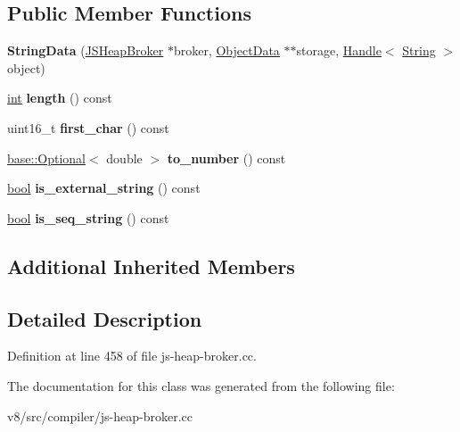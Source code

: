 \subsection*{Public Member Functions}
\begin{DoxyCompactItemize}
\item 
\mbox{\label{classv8_1_1internal_1_1compiler_1_1StringData_a19207d0108f212b6bbe337c6b49a9733}} 
{\bfseries String\+Data} (\mbox{\hyperlink{classv8_1_1internal_1_1compiler_1_1JSHeapBroker}{J\+S\+Heap\+Broker}} $\ast$broker, \mbox{\hyperlink{classv8_1_1internal_1_1compiler_1_1ObjectData}{Object\+Data}} $\ast$$\ast$storage, \mbox{\hyperlink{classv8_1_1internal_1_1Handle}{Handle}}$<$ \mbox{\hyperlink{classv8_1_1internal_1_1String}{String}} $>$ object)
\item 
\mbox{\label{classv8_1_1internal_1_1compiler_1_1StringData_a81f6f4932b95a485268c1db8f451e032}} 
\mbox{\hyperlink{classint}{int}} {\bfseries length} () const
\item 
\mbox{\label{classv8_1_1internal_1_1compiler_1_1StringData_a1132f6d603045bec73f5f9e1aa2cd648}} 
uint16\+\_\+t {\bfseries first\+\_\+char} () const
\item 
\mbox{\label{classv8_1_1internal_1_1compiler_1_1StringData_aad2337c802f4112335e14c749e0c304c}} 
\mbox{\hyperlink{classv8_1_1base_1_1Optional}{base\+::\+Optional}}$<$ double $>$ {\bfseries to\+\_\+number} () const
\item 
\mbox{\label{classv8_1_1internal_1_1compiler_1_1StringData_aee112f4dacbb2d603ad0623fc3dcb063}} 
\mbox{\hyperlink{classbool}{bool}} {\bfseries is\+\_\+external\+\_\+string} () const
\item 
\mbox{\label{classv8_1_1internal_1_1compiler_1_1StringData_aaa6b0b8dd7f5a66e5cb8cb6195492a0b}} 
\mbox{\hyperlink{classbool}{bool}} {\bfseries is\+\_\+seq\+\_\+string} () const
\end{DoxyCompactItemize}
\subsection*{Additional Inherited Members}


\subsection{Detailed Description}


Definition at line 458 of file js-\/heap-\/broker.\+cc.



The documentation for this class was generated from the following file\+:\begin{DoxyCompactItemize}
\item 
v8/src/compiler/js-\/heap-\/broker.\+cc\end{DoxyCompactItemize}
